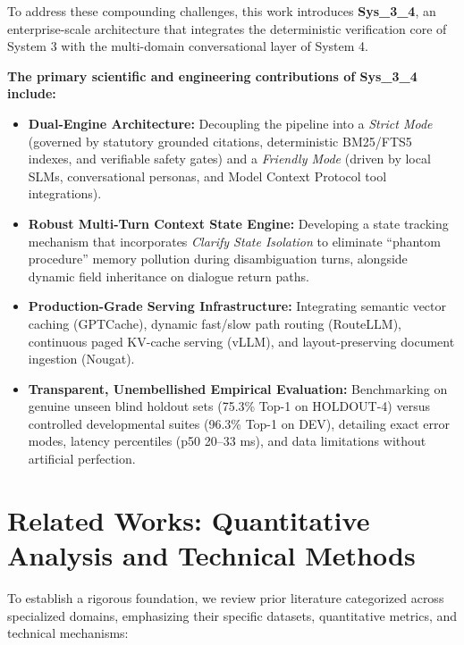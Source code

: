 \documentclass[11pt,a4paper]{article}
\begin{document}
To address these compounding challenges, this work introduces \textbf{Sys\_3\_4}, an enterprise-scale architecture that integrates the deterministic verification core of System 3 with the multi-domain conversational layer of System 4.

\vspace{1ex}
\noindent\textbf{The primary scientific and engineering contributions of Sys\_3\_4 include:}
\begin{itemize}
    \item \textbf{Dual-Engine Architecture:} Decoupling the pipeline into a \textit{Strict Mode} (governed by statutory grounded citations, deterministic BM25/FTS5 indexes, and verifiable safety gates) and a \textit{Friendly Mode} (driven by local SLMs, conversational personas, and Model Context Protocol tool integrations).
    \item \textbf{Robust Multi-Turn Context State Engine:} Developing a state tracking mechanism that incorporates \textit{Clarify State Isolation} to eliminate ``phantom procedure'' memory pollution during disambiguation turns, alongside dynamic field inheritance on dialogue return paths.
    \item \textbf{Production-Grade Serving Infrastructure:} Integrating semantic vector caching (GPTCache), dynamic fast/slow path routing (RouteLLM), continuous paged KV-cache serving (vLLM), and layout-preserving document ingestion (Nougat).
    \item \textbf{Transparent, Unembellished Empirical Evaluation:} Benchmarking on genuine unseen blind holdout sets (75.3\% Top-1 on HOLDOUT-4) versus controlled developmental suites (96.3\% Top-1 on DEV), detailing exact error modes, latency percentiles (p50 20--33 ms), and data limitations without artificial perfection.
\end{itemize}

\section{Related Works: Quantitative Analysis and Technical Methods}
To establish a rigorous foundation, we review prior literature categorized across specialized domains, emphasizing their specific datasets, quantitative metrics, and technical mechanisms:
\end{document}
